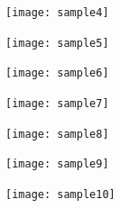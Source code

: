\documentclass[12pt]{article}
\begin{document}
    \begin{figure}[h!]
    \centering
    \texttt{[image: sample4]}
    \end{figure}
    \newpage

    \begin{figure}[h!]
    \centering
    \texttt{[image: sample5]}
    \end{figure}
    \newpage

    \begin{figure}[h!]
    \centering
    \texttt{[image: sample6]}
    \end{figure}
    \newpage

    \begin{figure}[h!]
    \centering
    \texttt{[image: sample7]}
    \end{figure}
    \newpage

    \begin{figure}[h!]
    \centering
    \texttt{[image: sample8]}
    \end{figure}
    \newpage

    \begin{figure}[h!]
    \centering
    \texttt{[image: sample9]}
    \end{figure}
    \newpage

    \begin{figure}[h!]
    \centering
    \texttt{[image: sample10]}
    \end{figure}
    \newpage
\end{document}
